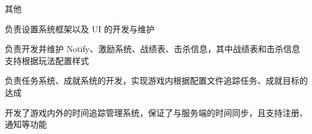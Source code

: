 \begin{cventries}
{\begin{cvitems}
{\begin{cvsubitems}
                \end{cvsubitems}
            }
            \item {其他
                \begin{cvsubitems}
                    \item {负责设置系统框架以及 UI 的开发与维护}
                    \item {负责开发并维护 Notify、激励系统、战绩表、击杀信息，其中战绩表和击杀信息支持根据玩法配置样式}
                    \item {负责任务系统、成就系统的开发，实现游戏内根据配置文件追踪任务、成就目标的达成}
                    \item {开发了游戏内外的时间追踪管理系统，保证了与服务端的时间同步，且支持注册、通知等功能}
                \end{cvsubitems}
            }
        \end{cvitems}
    }


\end{cventries}
